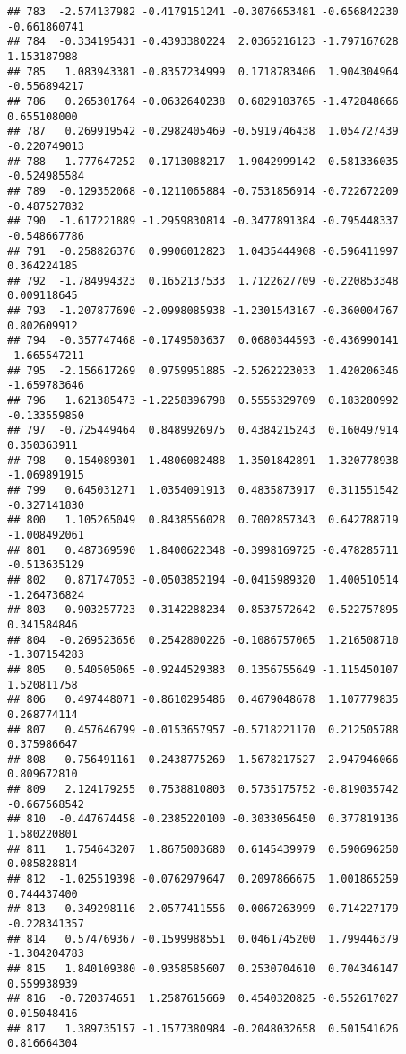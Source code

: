 \documentclass[
]{article}
\begin{document}
\begin{verbatim}
## 783  -2.574137982 -0.4179151241 -0.3076653481 -0.656842230 -0.661860741
## 784  -0.334195431 -0.4393380224  2.0365216123 -1.797167628  1.153187988
## 785   1.083943381 -0.8357234999  0.1718783406  1.904304964 -0.556894217
## 786   0.265301764 -0.0632640238  0.6829183765 -1.472848666  0.655108000
## 787   0.269919542 -0.2982405469 -0.5919746438  1.054727439 -0.220749013
## 788  -1.777647252 -0.1713088217 -1.9042999142 -0.581336035 -0.524985584
## 789  -0.129352068 -0.1211065884 -0.7531856914 -0.722672209 -0.487527832
## 790  -1.617221889 -1.2959830814 -0.3477891384 -0.795448337 -0.548667786
## 791  -0.258826376  0.9906012823  1.0435444908 -0.596411997  0.364224185
## 792  -1.784994323  0.1652137533  1.7122627709 -0.220853348  0.009118645
## 793  -1.207877690 -2.0998085938 -1.2301543167 -0.360004767  0.802609912
## 794  -0.357747468 -0.1749503637  0.0680344593 -0.436990141 -1.665547211
## 795  -2.156617269  0.9759951885 -2.5262223033  1.420206346 -1.659783646
## 796   1.621385473 -1.2258396798  0.5555329709  0.183280992 -0.133559850
## 797  -0.725449464  0.8489926975  0.4384215243  0.160497914  0.350363911
## 798   0.154089301 -1.4806082488  1.3501842891 -1.320778938 -1.069891915
## 799   0.645031271  1.0354091913  0.4835873917  0.311551542 -0.327141830
## 800   1.105265049  0.8438556028  0.7002857343  0.642788719 -1.008492061
## 801   0.487369590  1.8400622348 -0.3998169725 -0.478285711 -0.513635129
## 802   0.871747053 -0.0503852194 -0.0415989320  1.400510514 -1.264736824
## 803   0.903257723 -0.3142288234 -0.8537572642  0.522757895  0.341584846
## 804  -0.269523656  0.2542800226 -0.1086757065  1.216508710 -1.307154283
## 805   0.540505065 -0.9244529383  0.1356755649 -1.115450107  1.520811758
## 806   0.497448071 -0.8610295486  0.4679048678  1.107779835  0.268774114
## 807   0.457646799 -0.0153657957 -0.5718221170  0.212505788  0.375986647
## 808  -0.756491161 -0.2438775269 -1.5678217527  2.947946066  0.809672810
## 809   2.124179255  0.7538810803  0.5735175752 -0.819035742 -0.667568542
## 810  -0.447674458 -0.2385220100 -0.3033056450  0.377819136  1.580220801
## 811   1.754643207  1.8675003680  0.6145439979  0.590696250  0.085828814
## 812  -1.025519398 -0.0762979647  0.2097866675  1.001865259  0.744437400
## 813  -0.349298116 -2.0577411556 -0.0067263999 -0.714227179 -0.228341357
## 814   0.574769367 -0.1599988551  0.0461745200  1.799446379 -1.304204783
## 815   1.840109380 -0.9358585607  0.2530704610  0.704346147  0.559938939
## 816  -0.720374651  1.2587615669  0.4540320825 -0.552617027  0.015048416
## 817   1.389735157 -1.1577380984 -0.2048032658  0.501541626  0.816664304

\end{verbatim}
\end{document}
